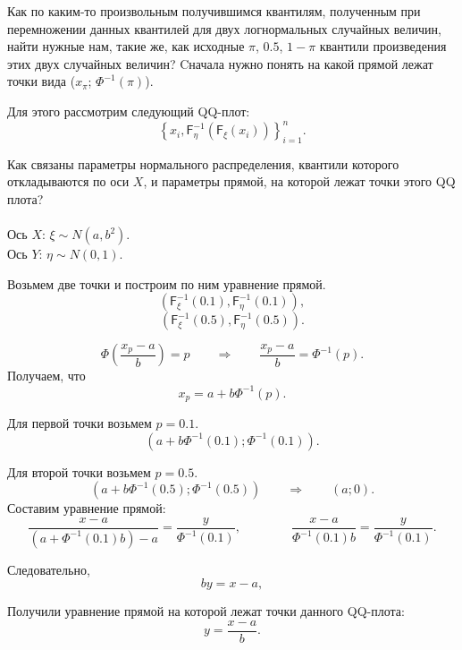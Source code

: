 \documentclass[12pt]{article}
\begin{document}
	Как по каким-то произвольным получившимся квантилям, полученным при перемножении данных квантилей для двух логнормальных случайных величин, найти нужные нам, такие же, как исходные $\pi$, $0.5$, $1-\pi$ квантили произведения этих двух случайных величин? Cначала нужно понять на какой прямой лежат точки вида ($x_{\pi}$; $\Phi^{-1}(\pi)$).
	
	Для этого рассмотрим следующий QQ-плот:
	\[\left\{x_{i},\mathsf{F}_{\eta}^{-1}(\mathsf{F}_{\xi}(x_{i}))\right\}_{i=1}^{n}.\]
	
	Как связаны параметры нормального распределения, квантили которого откладываются по оси $X$, и параметры прямой, на которой лежат точки этого QQ плота?\\\\
	Ось $X$: $\xi \sim N(a, b^{2})$.\\
	Ось $Y$: $\eta \sim N(0, 1)$.
	
	Возьмем две точки и построим по ним уравнение прямой.\\
	\[(\mathsf{F}_{\xi}^{-1}(0.1), \mathsf{F}_{\eta}^{-1}(0.1)),\]
	\[(\mathsf{F}_{\xi}^{-1}(0.5), \mathsf{F}_{\eta}^{-1}(0.5)).\]
	
	\begin{equation*}
		\Phi\left(\dfrac{x_{p}-a}{b}\right)=p\quad\quad \Rightarrow \quad\quad \dfrac{x_{p}-a}{b}=\Phi^{-1}(p).
	\end{equation*}
	Получаем, что
	\begin{equation*}
		x_{p}=a+b\Phi^{-1}(p).
	\end{equation*}
	
	Для первой точки возьмем $p = 0.1$.
	\[(a+b\Phi^{-1}(0.1); \Phi^{-1}(0.1)).\]
	
	Для второй точки возьмем $p = 0.5$.
	\[(a+b\Phi^{-1}(0.5); \Phi^{-1}(0.5)) \quad\quad \Rightarrow \quad\quad (a;0). \]
	Составим уравнение прямой:
	\[\dfrac{x-a}{(a+\Phi^{-1}(0.1)b)-a} = \dfrac{y}{\Phi^{-1}(0.1)}, \quad\quad\quad\quad \dfrac{x-a}{\Phi^{-1}(0.1)b} = \dfrac{y}{\Phi^{-1}(0.1)}.\]
	
	Следовательно,
	\begin{equation*} 
		by = x-a,
	\end{equation*}
	
	Получили уравнение прямой на которой лежат точки данного QQ-плота:
	\begin{equation}
		y = \dfrac{x-a}{b}.\label{19}
	\end{equation}
	\\
	
\end{document}
